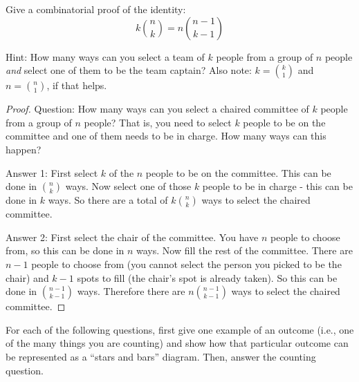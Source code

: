 \documentclass[10pt]{exam}
\begin{document}
\begin{questions}
 \question[6] Give a combinatorial proof of the identity:
 \[k{n\choose k} = n{n-1 \choose k-1}\]

 Hint: How many ways can you select a team of $k$ people from a group of $n$ people \emph{and} select one of them to be the team captain?  Also note: $k = \binom{k}{1}$ and $n = \binom{n}{1}$, if that helps.
   \begin{solution}
     \begin{proof}
       Question: How many ways can you select a chaired committee of $k$ people from a group of $n$ people?  That is, you need to select $k$ people to be on the committee and one of them needs to be in charge.  How many ways can this happen?

       Answer 1: First select $k$ of the $n$ people to be on the committee.  This can be done in ${n \choose k}$ ways.  Now select one of those $k$ people to be in charge - this can be done in $k$ ways.  So there are a total of $k {n \choose k}$ ways to select the chaired committee.

       Answer 2: First select the chair of the committee.  You have $n$ people to choose from, so this can be done in $n$ ways.  Now fill the rest of the committee.  There are $n-1$ people to choose from (you cannot select the person you picked to be the chair) and $k-1$ spots to fill (the chair's spot is already taken).  So this can be done in ${n-1 \choose k-1}$ ways.  Therefore there are $n{n-1 \choose k-1}$ ways to select the chaired committee.
     \end{proof}

   \end{solution}



 	\question[6] For each of the following questions, first give one example of an outcome (i.e., one of the many things you are counting) and show how that particular outcome can be represented as a ``stars and bars'' diagram.  Then, answer the counting question.
\end{questions}
\end{document}
